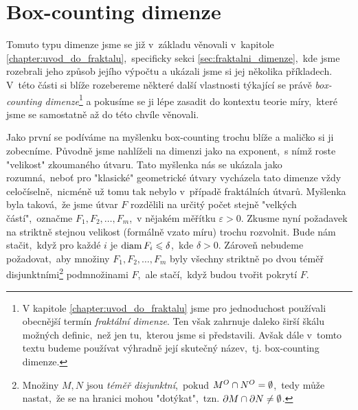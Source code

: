 \section{Box-counting dimenze}\label{sec:box-counting-dimenze}

Tomuto typu dimenze jsme se již v~základu věnovali v~kapitole \ref{chapter:uvod_do_fraktalu},~specificky sekci \ref{sec:fraktalni_dimenze},~kde jsme rozebrali jeho způsob jejího výpočtu a ukázali jsme si jej několika příkladech. V~této části si blíže rozebereme některé další vlastnosti týkající se právě \emph{box-counting dimenze}\footnote{V kapitole \ref{chapter:uvod_do_fraktalu} jsme pro jednoduchost používali obecnější termín \emph{fraktální dimenze}. Ten však zahrnuje daleko širší škálu možných definic,~než jen tu,~kterou jsme si představili. Avšak dále v~tomto textu budeme používat výhradně její skutečný název,~tj. box-counting dimenze.} a pokusíme se ji lépe zasadit do kontextu teorie míry,~které jsme se samostatně až do této chvíle věnovali.

Jako první se podíváme na myšlenku box-counting trochu blíže a maličko si ji zobecníme. Původně jsme nahlíželi na dimenzi jako na exponent,~s nímž roste "velikost" zkoumaného útvaru. Tato myšlenka nás se ukázala jako rozumná,~neboť pro "klasické" geometrické útvary vycházela tato dimenze vždy celočíselně,~nicméně už tomu tak nebylo v~případě fraktálních útvarů. Myšlenka byla taková,~že jsme útvar $F$ rozdělili na určitý počet stejně "velkých částí",~označme $F_1,F_2,\ldots,F_m$,~v nějakém měřítku $\varepsilon>0$. Zkusme nyní požadavek na striktně stejnou velikost (formálně vzato míru) trochu rozvolnit. Bude nám stačit,~když pro každé $i$ je $\operatorname{diam}{F_i}\leqslant\delta$,~kde $\delta>0$. Zároveň nebudeme požadovat,~aby množiny $F_1,F_2,\ldots,F_m$ byly všechny striktně po dvou téměř disjunktními\footnote{Množiny $M,N$ jsou \emph{téměř disjunktní},~pokud $M^O\cap N^O=\emptyset$,~tedy může nastat,~že se na hranici mohou "dotýkat",~tzn. $\partial M\cap\partial N\neq\emptyset$.} podmnožinami $F$,~ale stačí,~když budou tvořit pokrytí $F$.

